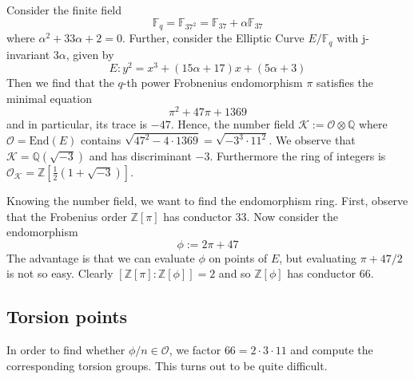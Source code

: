 \documentclass{scrartcl}
\newcommand{\Z}{\mathbb{Z}}
\newcommand{\F}{\mathbb{F}}
\newcommand{\End}{\mathrm{End}}
\newcommand{\K}{\mathcal{K}}
\renewcommand{\O}{\mathcal{O}}
\theoremstyle{definition}
\begin{document}
Consider the finite field
\begin{equation*}
    \F_q = \F_{37^2} = \F_{37} + \alpha \F_{37}
\end{equation*}
where $\alpha^2 + 33\alpha + 2 = 0$.
Further, consider the Elliptic Curve $E/\F_q$ with j-invariant $3\alpha$, given by
\begin{equation*}
    E: y^2 = x^3 + (15\alpha + 17)x + (5\alpha + 3)
\end{equation*}
Then we find that the $q$-th power Frobnenius endomorphism $\pi$ satisfies the minimal equation
\begin{equation*}
    \pi^2 + 47 \pi + 1369
\end{equation*}
and in particular, its trace is $-47$.
Hence, the number field $\K := \O \otimes \mathbb{Q}$ where $\O = \End(E)$ contains $\sqrt{47^2 - 4 \cdot 1369} = \sqrt{-3^3 \cdot 11^2}$.
We observe that $\K = \mathbb{Q}(\sqrt{-3})$ and has discriminant $-3$.
Furthermore the ring of integers is $\O_\K = \Z[\frac 1 2(1 + \sqrt{-3})]$.

Knowing the number field, we want to find the endomorphism ring.
First, observe that the Frobenius order $\Z[\pi]$ has conductor 33.
Now consider the endomorphism
\begin{equation*}
    \phi := 2\pi + 47
\end{equation*}
The advantage is that we can evaluate $\phi$ on points of $E$, but evaluating $\pi + 47/2$ is not so easy.
Clearly $[\Z[\pi] : \Z[\phi]] = 2$ and so $\Z[\phi]$ has conductor 66.

\subsection*{Torsion points}
In order to find whether $\phi/n \in \O$, we factor $66 = 2 \cdot 3 \cdot 11$ and compute the corresponding torsion groups.
This turns out to be quite difficult.
\end{document}

